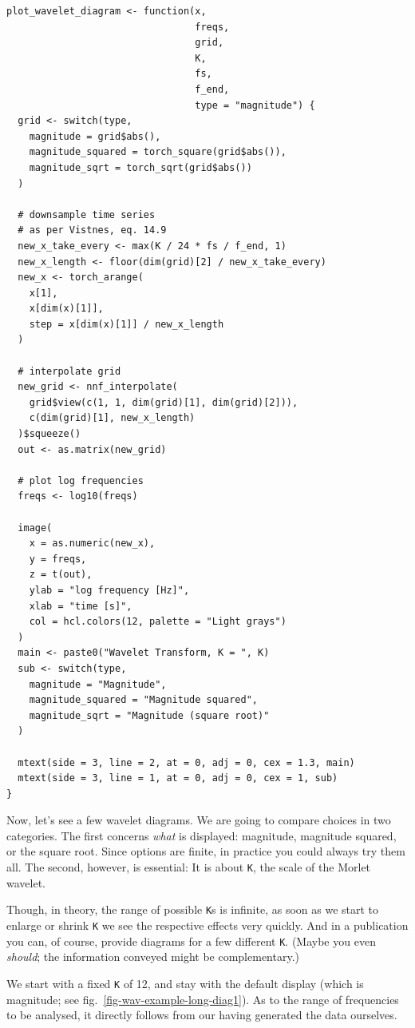 \documentclass[
  letterpaper,
]{krantz}
\begin{document}
\begin{verbatim}
plot_wavelet_diagram <- function(x,
                                 freqs,
                                 grid,
                                 K,
                                 fs,
                                 f_end,
                                 type = "magnitude") {
  grid <- switch(type,
    magnitude = grid$abs(),
    magnitude_squared = torch_square(grid$abs()),
    magnitude_sqrt = torch_sqrt(grid$abs())
  )

  # downsample time series
  # as per Vistnes, eq. 14.9
  new_x_take_every <- max(K / 24 * fs / f_end, 1)
  new_x_length <- floor(dim(grid)[2] / new_x_take_every)
  new_x <- torch_arange(
    x[1],
    x[dim(x)[1]],
    step = x[dim(x)[1]] / new_x_length
  )
  
  # interpolate grid
  new_grid <- nnf_interpolate(
    grid$view(c(1, 1, dim(grid)[1], dim(grid)[2])),
    c(dim(grid)[1], new_x_length)
  )$squeeze()
  out <- as.matrix(new_grid)

  # plot log frequencies
  freqs <- log10(freqs)
  
  image(
    x = as.numeric(new_x),
    y = freqs,
    z = t(out),
    ylab = "log frequency [Hz]",
    xlab = "time [s]",
    col = hcl.colors(12, palette = "Light grays")
  )
  main <- paste0("Wavelet Transform, K = ", K)
  sub <- switch(type,
    magnitude = "Magnitude",
    magnitude_squared = "Magnitude squared",
    magnitude_sqrt = "Magnitude (square root)"
  )

  mtext(side = 3, line = 2, at = 0, adj = 0, cex = 1.3, main)
  mtext(side = 3, line = 1, at = 0, adj = 0, cex = 1, sub)
}
\end{verbatim}

Now, let's see a few wavelet diagrams. We are going to compare choices
in two categories. The first concerns \emph{what} is displayed:
magnitude, magnitude squared, or the square root. Since options are
finite, in practice you could always try them all. The second, however,
is essential: It is about \texttt{K}, the scale of the Morlet wavelet.

Though, in theory, the range of possible \texttt{K}s is infinite, as
soon as we start to enlarge or shrink \texttt{K} we see the respective
effects very quickly. And in a publication you can, of course, provide
diagrams for a few different \texttt{K}. (Maybe you even \emph{should};
the information conveyed might be complementary.)

We start with a fixed \texttt{K} of 12, and stay with the default
display (which is magnitude; see fig.~\ref{fig-wav-example-long-diag1}).
As to the range of frequencies to be analysed, it directly follows from
our having generated the data ourselves.
\end{document}
